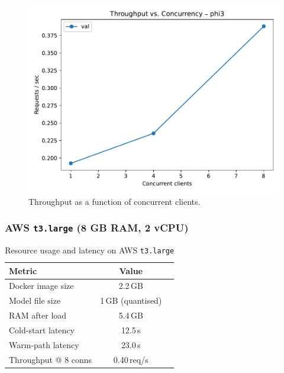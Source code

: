 \documentclass[conference]{IEEEtran}
\begin{document}
\begin{figure}[t]
  \centering
  \includegraphics[width=\linewidth]{throughput_vs_c}
  \caption{Throughput as a function of concurrent clients.}
  \label{fig:throughput}
\end{figure}
\vspace{0.6em}
\subsubsection*{AWS \texttt{t3.large} (8 GB RAM, 2 vCPU)}

\begin{table}[t]
  \caption{Resource usage and latency on AWS \texttt{t3.large}}
  \label{tab:aws_metrics}
  \centering
  \begin{tabular}{lcc}
    \toprule
      \textbf{Metric} & \textbf{Value} \\
    \midrule
      Docker image size   & 2.2\,GB \\
      Model file size     & 1\,GB (quantised) \\
      RAM after load      & 5.4\,GB \\
      Cold-start latency  & 12.5\,s \\
      Warm-path latency   & 23.0\,s \\
      Throughput @ 8 conns & 0.40\,req/s \\
    \bottomrule
  \end{tabular}
\end{table}
\end{document}
